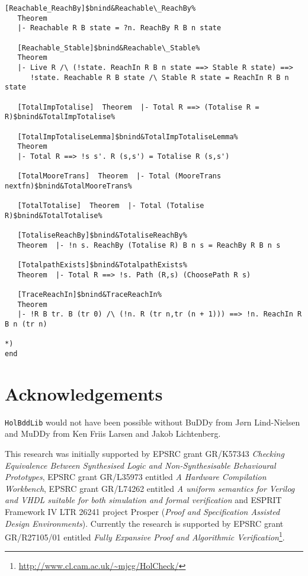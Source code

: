 \documentclass[12pt]{article}
\renewcommand{\t}[1]{\mbox{\tt #1}}
\newcommand{\Buddy}{BuDDy\xspace}
\newcommand{\Muddy}{MuDDy\xspace}
\begin{document}
\begin{footnotesize}
\begin{Verbatim}[commandchars=\$\&\%]
   [Reachable_ReachBy]$bnind&Reachable\_ReachBy%
   Theorem
   |- Reachable R B state = ?n. ReachBy R B n state
   
   [Reachable_Stable]$bnind&Reachable\_Stable%
   Theorem
   |- Live R /\ (!state. ReachIn R B n state ==> Stable R state) ==>
      !state. Reachable R B state /\ Stable R state = ReachIn R B n state
   
   [TotalImpTotalise]  Theorem  |- Total R ==> (Totalise R = R)$bnind&TotalImpTotalise%
   
   [TotalImpTotaliseLemma]$bnind&TotalImpTotaliseLemma%
   Theorem
   |- Total R ==> !s s'. R (s,s') = Totalise R (s,s')
   
   [TotalMooreTrans]  Theorem  |- Total (MooreTrans nextfn)$bnind&TotalMooreTrans%
   
   [TotalTotalise]  Theorem  |- Total (Totalise R)$bnind&TotalTotalise%
   
   [TotaliseReachBy]$bnind&TotaliseReachBy%
   Theorem  |- !n s. ReachBy (Totalise R) B n s = ReachBy R B n s
   
   [TotalpathExists]$bnind&TotalpathExists%
   Theorem  |- Total R ==> !s. Path (R,s) (ChoosePath R s)
   
   [TraceReachIn]$bnind&TraceReachIn%
   Theorem
   |- !R B tr. B (tr 0) /\ (!n. R (tr n,tr (n + 1))) ==> !n. ReachIn R B n (tr n)

*)
end
\end{Verbatim}
\end{footnotesize}

\section*{Acknowledgements}

\t{HolBddLib} would not have been possible without \Buddy from
J{\o}rn Lind-Nielsen and \Muddy from Ken Friis Larsen and Jakob Lichtenberg.

This research was initially supported by EPSRC grant
GR/K57343 {\em Checking Equivalence Between Synthesised Logic and
Non-Synthesisable Behavioural Prototypes}, EPSRC grant GR/L35973
entitled {\it A Hardware Compilation Workbench\/}, EPSRC grant
GR/L74262 entitled {\it A uniform semantics for Verilog and VHDL
suitable for both simulation and formal verification\/} and ESPRIT
Framework IV LTR 26241 project Prosper ({\em Proof and Specification
Assisted Design Environments}). Currently the research is supported by
EPSRC grant GR/R27105/01 entitled {\it Fully Expansive Proof and
Algorithmic Verification\/}\footnote{\url{http://www.cl.cam.ac.uk/~mjcg/HolCheck/}}.
\end{document}
